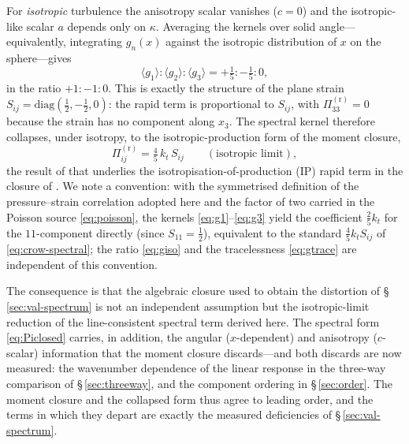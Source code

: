 \documentclass[11pt,a4paper]{article}
\newcounter{assumption}
\begin{document}
For \emph{isotropic} turbulence the anisotropy scalar vanishes ($c=0$) and the
isotropic-like scalar $a$ depends only on $\kappa$. Averaging the kernels over
solid angle---equivalently, integrating $g_n(x)$ against the isotropic
distribution of $x$ on the sphere---gives
\begin{equation}
  \langle g_1\rangle : \langle g_2\rangle : \langle g_3\rangle
  = +\tfrac15 : -\tfrac15 : 0,
  \label{eq:giso}
\end{equation}
in the ratio $+1:-1:0$. This is exactly the structure of the plane strain
$S_{ij}=\mathrm{diag}(\tfrac12,-\tfrac12,0)$: the rapid term is proportional to
$S_{ij}$, with $\Pi^{(\mathrm r)}_{33}=0$ because the strain has no component
along $x_3$. The spectral kernel therefore collapses, under isotropy, to the
isotropic-production form of the moment closure,
\begin{equation}
  \Pi^{(\mathrm r)}_{ij}
  = \tfrac{4}{5}\,k_t\,S_{ij}
  \qquad(\text{isotropic limit}),
  \label{eq:crow-spectral}
\end{equation}
the result of \citet{Crow1968} that underlies the isotropisation-of-production
(IP) rapid term in the closure of \citet{LaunderReeceRodi1975}. We note a
convention: with the symmetrised definition of the pressure--strain correlation
adopted here and the factor of two carried in the Poisson source
\eqref{eq:poisson}, the kernels \eqref{eq:g1}--\eqref{eq:g3} yield the
coefficient $\tfrac25 k_t$ for the $11$-component directly (since $S_{11}=\tfrac12$),
equivalent to the standard $\tfrac45 k_t S_{ij}$ of \eqref{eq:crow-spectral}; the ratio
\eqref{eq:giso} and the tracelessness \eqref{eq:gtrace} are independent of this
convention.

The consequence is that the algebraic closure used to obtain the distortion of
\S\,\ref{sec:val-spectrum} is not an independent assumption but the
isotropic-limit reduction of the line-consistent spectral term derived here.
The spectral form \eqref{eq:Piclosed} carries, in addition, the angular
($x$-dependent) and anisotropy ($c$-scalar) information that the moment closure
discards---and both discards are now measured: the wavenumber dependence
of the linear response in the three-way comparison of
\S\,\ref{sec:threeway}, and the component ordering in
\S\,\ref{sec:order}. The moment closure and the collapsed form thus
agree to leading order, and the terms in which they depart are exactly
the measured deficiencies of \S\,\ref{sec:val-spectrum}.
\end{document}
